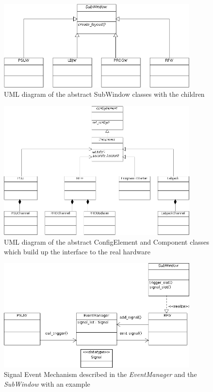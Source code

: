 \documentclass[10pt,a4paper]{article}
\begin{document}
\begin{figure}[H]
\centering
\includegraphics[width=0.9\textwidth]{./A_SubWindowDiagramm.png}
\caption{UML diagram of the abstract SubWindow classes with the children}
\end{figure}

\begin{figure}[H]
\centering
\includegraphics[width=0.9\textwidth]{./A_ComponentDiagramm.png}
\caption{UML diagram of the abstract ConfigElement and Component classes which build up the interface to the real hardware}
\end{figure}

\begin{figure}[H]
\centering
\includegraphics[width=0.9\textwidth]{./A_EventManager.png}
\caption{Signal Event Mechanism described in the \textit{EventManager} and the \textit{SubWindow} with an example}
\label{f:signal_event_mechanism}
\end{figure}
\end{document}
